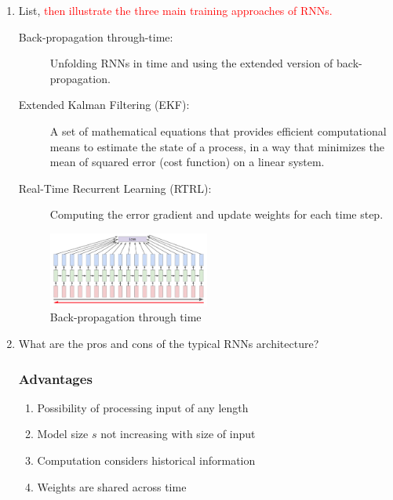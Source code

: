 \documentclass[12pt]{article}
\newenvironment{QandA}{\begin{enumerate}[label=\bfseries\arabic*.]\bfseries}
{\end{enumerate}}
\newenvironment{answered}{\par\normalfont\color{Sepia}}{}
\begin{document}
\begin{QandA}
\begin{answered}
    \end{answered}

    \item List, \textcolor{red}{then illustrate the three main training approaches of RNNs.}
    \begin{answered}
        \begin{description}
            \item[Back-propagation through-time:] Unfolding RNNs in time and using the extended version of back-propagation.
            \item[Extended Kalman Filtering (EKF):] A set of mathematical equations that provides efficient computational means to estimate the state of a process, in a way that minimizes the mean of squared error (cost function) on a linear system.
            \item[Real-Time Recurrent Learning (RTRL):] Computing the error gradient and update weights for each time step.
        \end{description}
        \begin{figure}[h!]
            \centering
            \includegraphics[width=0.5\textwidth]{back_prop_time.png}
            \caption{Back-propagation through time}
            \label{fig:backprop}
        \end{figure}
    \end{answered}

    \item What are the pros and cons of the typical RNNs architecture?
    \begin{answered}
        \subsubsection*{Advantages}
        \begin{enumerate}
            \item Possibility of processing input of any length
            \item Model size $s$ not increasing with size of input
            \item Computation considers historical information
            \item Weights are shared across time
        \end{enumerate}

\end{answered}
\end{QandA}
\end{document}
